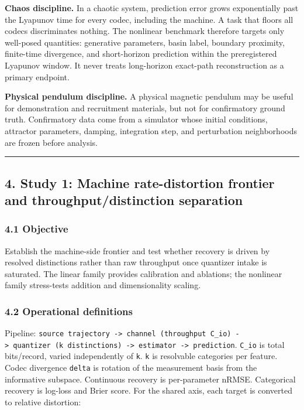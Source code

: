 \documentclass[
  11pt,
]{article}
\begin{document}
\textbf{Chaos discipline.} In a chaotic system,
prediction error grows exponentially past the Lyapunov
time for every codec, including the machine. A task
that floors all codecs discriminates nothing. The
nonlinear benchmark therefore targets only well-posed
quantities: generative parameters, basin label,
boundary proximity, finite-time divergence, and
short-horizon prediction within the preregistered
Lyapunov window. It never treats long-horizon
exact-path reconstruction as a primary endpoint.

\textbf{Physical pendulum discipline.} A physical
magnetic pendulum may be useful for demonstration and
recruitment materials, but not for confirmatory ground
truth. Confirmatory data come from a simulator whose
initial conditions, attractor parameters, damping,
integration step, and perturbation neighborhoods are
frozen before analysis.

\begin{center}\rule{0.5\linewidth}{0.5pt}\end{center}

\subsection{4. Study 1: Machine rate-distortion
frontier and throughput/distinction
separation}\label{study-1-machine-rate-distortion-frontier-and-throughputdistinction-separation}

\subsubsection{4.1 Objective}\label{objective}

Establish the machine-side frontier and test whether
recovery is driven by resolved distinctions rather than
raw throughput once quantizer intake is saturated. The
linear family provides calibration and ablations; the
nonlinear family stress-tests addition and
dimensionality scaling.

\subsubsection{4.2 Operational
definitions}\label{operational-definitions}

Pipeline:
\texttt{source\ trajectory\ -\textgreater{}\ channel\ (throughput\ C\_io)\ -\textgreater{}\ quantizer\ (k\ distinctions)\ -\textgreater{}\ estimator\ -\textgreater{}\ prediction}.
\texttt{C\_io} is total bits/record, varied
independently of \texttt{k}. \texttt{k} is resolvable
categories per feature. Codec divergence \texttt{delta}
is rotation of the measurement basis from the
informative subspace. Continuous recovery is
per-parameter nRMSE. Categorical recovery is log-loss
and Brier score. For the shared axis, each target is
converted to relative distortion:
\end{document}
